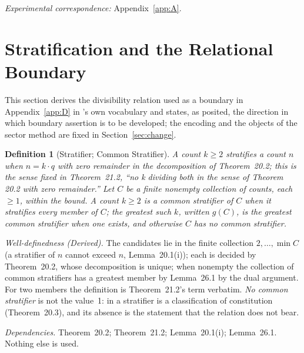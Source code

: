 \documentclass[pdflatex,sn-mathphys-num]{sn-jnl}
\theoremstyle{thmstyleone}%
\theoremstyle{thmstyletwo}%
\theoremstyle{thmstylethree}%
\newtheorem{definition}{Definition}[section]
\newtheorem{definition}{Definition}[section]
\newcommand{\PA}{\cite{Swanagon2026PA}}
\newcommand{\q}[1]{``#1''}        %
\newcommand{\deps}[1]{\par\begin{sloppypar}\noindent\emph{Dependencies.} #1 Nothing else is used.\end{sloppypar}}
\begin{document}
\begin{table}[!htbp]
\centering\small
\caption{The withdrawal table (Appendix~\ref{app:A}). The numerical objects of Section~10 of \PA{} withdrawn cumulatively, top to bottom.}
\label{tab:withdrawal}

\end{table}

\noindent\emph{Experimental correspondence:} Appendix~\ref{app:A}.

\section{Stratification and the Relational Boundary}\label{sec:encoding}
This section derives the divisibility relation used as a boundary in Appendix~\ref{app:D} in \PA's own vocabulary and states, as posited, the direction in which boundary assertion is to be developed; the encoding and the objects of the sector method are fixed in Section~\ref{sec:change}.

\begin{definition}[Stratifier; Common Stratifier]\label{def:stratifier}
A count $k\ge2$ \emph{stratifies} a count $n$ when $n=k\cdot q$ with zero remainder in the decomposition of Theorem~20.2; this is the sense fixed in Theorem~21.2, \q{no k dividing both in the sense of Theorem 20.2 with zero remainder.} Let $C$ be a finite nonempty collection of counts, each $\ge1$, within the bound. A count $k\ge2$ is a \emph{common stratifier} of $C$ when it stratifies every member of $C$; the greatest such $k$, written $g(C)$, is the \emph{greatest common stratifier} when one exists, and otherwise $C$ has \emph{no common stratifier}.
\end{definition}
\noindent\emph{Well-definedness (Derived).} The candidates lie in the finite collection $2,\dots,\min C$ (a stratifier of $n$ cannot exceed $n$, Lemma~20.1(i)); each is decided by Theorem~20.2, whose decomposition is unique; when nonempty the collection of common stratifiers has a greatest member by Lemma~26.1 by the dual argument. For two members the definition is Theorem~21.2's term verbatim. \emph{No common stratifier} is not the value~1: in \PA{} a stratifier is a classification of constitution (Theorem~20.3), and its absence is the statement that the relation does not bear.
\deps{Theorem~20.2; Theorem~21.2; Lemma~20.1(i); Lemma~26.1.}
\end{document}
